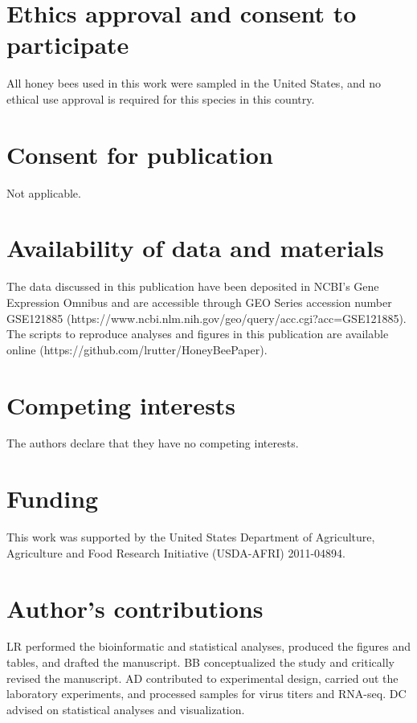 \documentclass{bmcart}
\begin{document}
\begin{linenumbers}
\begin{doublespacing}
\end{doublespacing} %


\begin{backmatter}

\section*{Ethics approval and consent to participate}
  All honey bees used in this work were sampled in the United States, and no ethical use approval is required for this species in this country.

\section*{Consent for publication}
  Not applicable.

\section*{Availability of data and materials}
  The data discussed in this publication have been deposited in NCBI's Gene Expression Omnibus \cite{geo} and are accessible through GEO Series accession number GSE121885 (https://www.ncbi.nlm.nih.gov/geo/query/acc.cgi?acc=GSE121885). The scripts to reproduce analyses and figures in this publication are available online (https://github.com/lrutter/HoneyBeePaper).

\section*{Competing interests}
  The authors declare that they have no competing interests.

\section*{Funding}
  This work was supported by the United States Department of Agriculture, Agriculture and Food Research Initiative (USDA-AFRI) 2011-04894.

\section*{Author's contributions}
  LR performed the bioinformatic and statistical analyses, produced the figures and tables, and drafted the manuscript. BB conceptualized the study and critically revised the manuscript. AD contributed to experimental design, carried out the laboratory experiments, and processed samples for virus titers and RNA-seq. 
DC advised on statistical analyses and visualization.
    

\end{backmatter}
\end{linenumbers}
\end{document}
